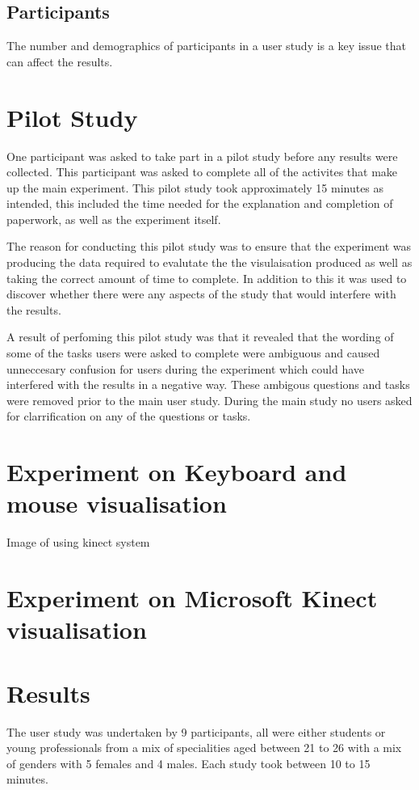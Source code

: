 \subsection{Participants}
The number and demographics of participants in a user study is a key issue that
can affect the results. ~

\section{Pilot Study}
One participant was asked to take part in a pilot study before any results were
collected. This participant was asked to complete all of the activites that make
up the main experiment. This pilot study took approximately 15 minutes as
intended, this included the time needed for the explanation and completion of
paperwork, as well as the experiment itself.

The reason for conducting this pilot study was to ensure that the experiment was
producing the data required to evalutate the the visulaisation produced as well
as taking the correct amount of time to complete. In addition to this it was
used to discover whether there were any aspects of the study that would
interfere with the results.

A result of perfoming this pilot study was that it revealed that the wording of
some of the tasks users were asked to complete were ambiguous and caused
unneccesary confusion for users during the experiment which could have
interfered with the results in a negative way. These ambigous questions and
tasks were removed prior to the main user study. During the main study no users
asked for  clarrification on any of the questions or tasks.

\section{Experiment on Keyboard and mouse visualisation}
Image of using kinect system

\section{Experiment on Microsoft Kinect visualisation}

\section{Results}
The user study was undertaken by 9 participants, all were either students or
young professionals from a mix of specialities aged between 21 to 26 with a mix
of genders with 5 females and 4 males. Each study took between 10 to 15 minutes.


